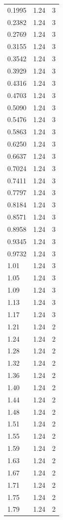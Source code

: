 \begin{longtable}{lrr}
  0.1995 & 1.24 & 3 \\
  0.2382 & 1.24 & 3 \\
  0.2769 & 1.24 & 3 \\
  0.3155 & 1.24 & 3 \\
  0.3542 & 1.24 & 3 \\
  0.3929 & 1.24 & 3 \\
  0.4316 & 1.24 & 3 \\
  0.4703 & 1.24 & 3 \\
  0.5090 & 1.24 & 3 \\
  0.5476 & 1.24 & 3 \\
  0.5863 & 1.24 & 3 \\
  0.6250 & 1.24 & 3 \\
  0.6637 & 1.24 & 3 \\
  0.7024 & 1.24 & 3 \\
  0.7411 & 1.24 & 3 \\
  0.7797 & 1.24 & 3 \\
  0.8184 & 1.24 & 3 \\
  0.8571 & 1.24 & 3 \\
  0.8958 & 1.24 & 3 \\
  0.9345 & 1.24 & 3 \\
  0.9732 & 1.24 & 3 \\
  1.01 & 1.24 & 3 \\
  1.05 & 1.24 & 3 \\
  1.09 & 1.24 & 3 \\
  1.13 & 1.24 & 3 \\
  1.17 & 1.24 & 3 \\
  1.21 & 1.24 & 2 \\
  1.24 & 1.24 & 2 \\
  1.28 & 1.24 & 2 \\
  1.32 & 1.24 & 2 \\
  1.36 & 1.24 & 2 \\
  1.40 & 1.24 & 2 \\
  1.44 & 1.24 & 2 \\
  1.48 & 1.24 & 2 \\
  1.51 & 1.24 & 2 \\
  1.55 & 1.24 & 2 \\
  1.59 & 1.24 & 2 \\
  1.63 & 1.24 & 2 \\
  1.67 & 1.24 & 2 \\
  1.71 & 1.24 & 2 \\
  1.75 & 1.24 & 2 \\
  1.79 & 1.24 & 2 \\

\end{longtable}

